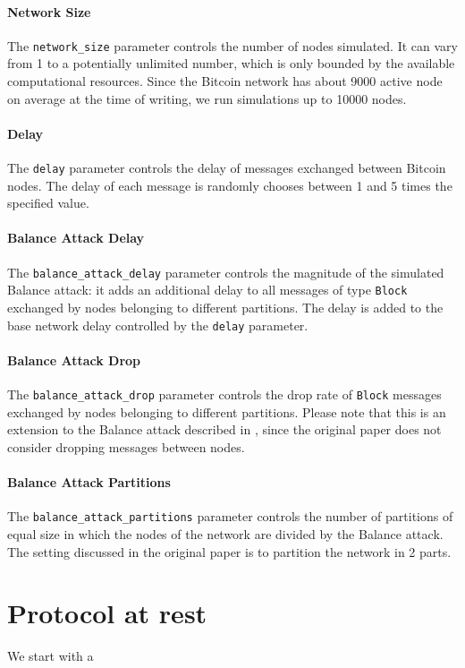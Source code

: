 \paragraph{Network Size}
The \texttt{network\_size} parameter controls the number of nodes simulated.
It can vary from \num{1} to a potentially unlimited number, which is only bounded by the available computational resources.
Since the Bitcoin network has about \num{9000} active node on average at the time of writing, we run simulations up to \num{10000} nodes.

\paragraph{Delay}
The \texttt{delay} parameter controls the delay of messages exchanged between Bitcoin nodes.
The delay of each message is randomly chooses between \num{1} and \num{5} times the specified value.

\paragraph{Balance Attack Delay}
The \texttt{balance\_attack\_delay} parameter controls the magnitude of the simulated Balance attack:
it adds an additional delay to all messages of type \texttt{Block} exchanged by nodes belonging to different partitions.
The delay is added to the base network delay controlled by the \texttt{delay} parameter.

\paragraph{Balance Attack Drop}
The \texttt{balance\_attack\_drop} parameter controls the drop rate of \texttt{Block} messages exchanged by nodes belonging to different partitions.
Please note that this is an extension to the Balance attack described in \cite{balance_attack_2017}, since the original paper does not consider dropping messages between nodes.

\paragraph{Balance Attack Partitions}
The \texttt{balance\_attack\_partitions} parameter controls the number of partitions of equal size in which the nodes of the network are divided by the Balance attack.
The setting discussed in the original paper is to partition the network in \num{2} parts.


\section{Protocol at rest}
We start with a
